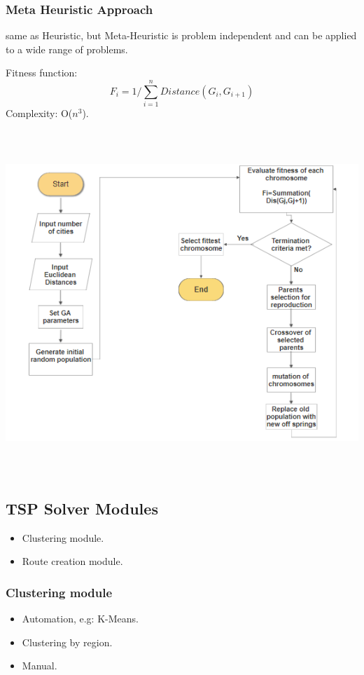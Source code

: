 \documentclass[12pt]{article}
\newcounter{subsubsubsection}[subsubsection]
\begin{document}
\subsubsection{ Meta Heuristic Approach }
same as Heuristic, but Meta-Heuristic is problem independent and can be applied to a wide range of problems.  

Fitness function:  $$F_{i} = 1 / \sum_{i=1}^{n} Distance(G_{i},G_{i+1})$$
Complexity: O($n^3$).
\begin{center}
	\includegraphics[width=17cm,height=13cm]{./assets/flowchart/ga.png}\\
\end{center}

\subsection{ TSP Solver Modules }
\begin{itemize}
	\item Clustering module.
	\item Route creation module.
\end{itemize}

\subsubsection{Clustering module}
\begin{itemize}
	\item Automation, e.g: K-Means.
	\item Clustering by region.
	\item Manual.
\end{itemize}
\end{document}
